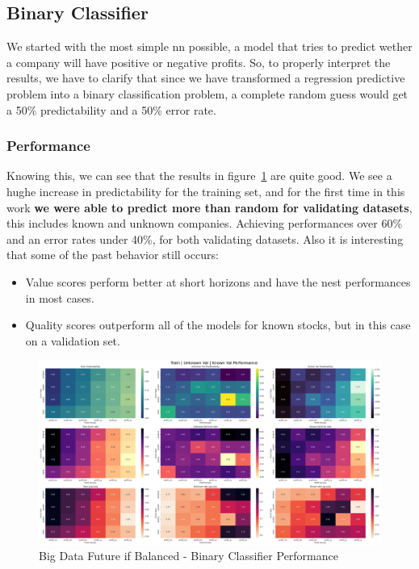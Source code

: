 \documentclass[11pt,english,a4paper,hidelinks]{book}
\begin{document}
\subsection{Binary Classifier}

\noindent We started with the most simple \acrshort{nn} possible, a model that tries to predict wether a company will have positive or negative profits. So, to properly interpret the results, we have to clarify that since we have transformed a regression predictive problem into a binary classification problem, a complete random guess would get a 50\% predictability and a 50\% error rate.

\subsubsection{Performance}
Knowing this, we can see that the results in figure~\ref{fig:binary_classifier} are quite good. We see a hughe increase in predictability for the training set, and for the first time in this work \textbf{we were able to predict more than random for validating datasets}, this includes known and unknown companies. Achieving performances over 60\% and an error rates under 40\%, for both validating datasets. Also it is interesting that some of the past behavior still occurs:
\begin{itemize}
    \item Value scores perform better at short horizons and have the nest performances in most cases.
    \item Quality scores outperform all of the models for known stocks, but in this case on a validation set.
\end{itemize}

\begin{figure}[H]
    \centering
    \includegraphics[width=1\textwidth]{images/code/models/neural_network/binary_classifier_nn/Big Data future - IF HARD Balanced/performance summary.png}
    \caption{Big Data Future \acrshort{if} Balanced - Binary Classifier Performance}
    \label{fig:binary_classifier}
\end{figure}
\end{document}
